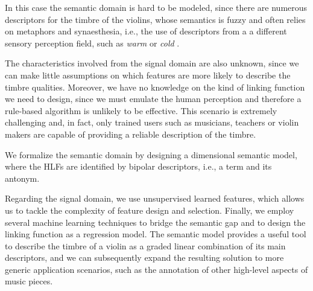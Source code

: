 In this case the semantic domain is hard to be modeled, since there are numerous descriptors for the timbre of the violins, whose semantics is fuzzy and often relies on metaphors and synaesthesia, i.e., the use of descriptors from a a different sensory perception field, such as \textit{warm} or \textit{cold} \cite{Zanoni2014}.  %

The characteristics involved from the signal domain are also unknown, since we can make little assumptions on which features are more likely to describe the timbre qualities. Moreover, we have no knowledge on the kind of linking function we need to design, since we must emulate the human perception and therefore a rule-based algorithm is unlikely to be effective. This scenario is extremely challenging and, in fact, only trained users such as musicians, teachers or violin makers are capable of providing a reliable description of the timbre.


We formalize the semantic domain by designing a dimensional semantic model, where the HLFs are identified by bipolar descriptors, i.e., a term and its antonym. %

Regarding the signal domain, we use unsupervised learned features, which allows us to tackle the complexity of feature design and selection. Finally, we employ several machine learning techniques to bridge the semantic gap and to design the linking function as a regression model. The semantic model provides a useful tool to describe the timbre of a violin as a graded linear combination of its main descriptors, and we can subsequently expand the resulting solution to more generic application scenarios, such as the annotation of other high-level aspects of music pieces.

